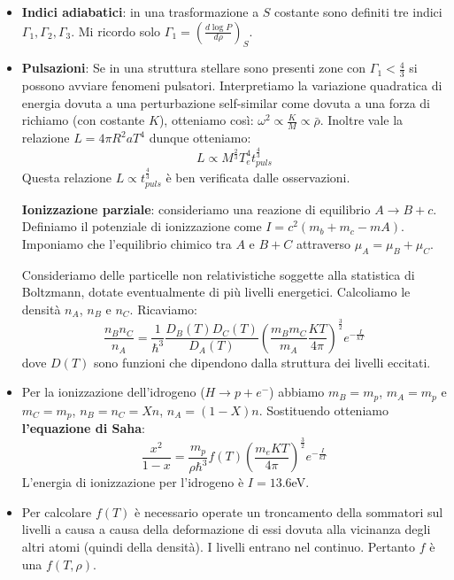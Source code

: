 \documentclass[11pt,a4paper]{article}
\begin{document}
\begin{itemize}
\item \textbf{Indici adiabatici}: in una trasformazione a $S$ costante sono definiti tre indici $\Gamma_1, \Gamma_2, \Gamma_3$. Mi ricordo solo $ \Gamma_1 = \left( \frac{d \log P}{d \rho}\right)_{S}$.

\item \textbf{Pulsazioni}: Se in una struttura stellare sono presenti zone con $\Gamma_1 < \frac{4}{3}$ si possono avviare fenomeni pulsatori. Interpretiamo la variazione quadratica di energia dovuta a una perturbazione self-similar come dovuta a una forza di richiamo (con costante $K$), otteniamo così: $\omega^2 \propto \frac{K}{M} \propto \bar{\rho}$. Inoltre vale la relazione $L = 4 \pi R^2 a T^4$ dunque otteniamo:
\begin{equation}
L \propto M^{\frac{2}{3}} T_{e}^4 t_{puls}^{\frac{4}{3}} 
\end{equation}  
Questa relazione $L \propto  t_{puls}^{\frac{4}{3}}$ è ben verificata dalle osservazioni.

\textbf{\textbf{Ionizzazione parziale}}: consideriamo una reazione di equilibrio $A \rightarrow B+c$. Definiamo il potenziale di ionizzazione come $I = c^2 \left(m_b + m_c - mA \right)$. Imponiamo che l'equilibrio chimico tra $A$ e $B+C$ attraverso $\mu_A = \mu_B + \mu_C$.

\text Consideriamo delle particelle non relativistiche soggette alla statistica di Boltzmann, dotate eventualmente di più livelli energetici. Calcoliamo le densità $n_A$, $n_B$ e $n_C$. Ricaviamo:
\begin{equation}
\frac{n_B n_C}{n_A} = \frac{1}{\hbar^3} \frac{D_B(T) D_C(T)}{D_A(T)} \left( \frac{m_B m_C}{m_A} \frac{KT}{4 \pi}\right)^{\frac{3}{2}}e^{-\frac{I}{kT}}
\end{equation}
dove $D(T)$ sono funzioni che dipendono dalla struttura dei livelli eccitati.

\item Per la ionizzazione dell'idrogeno ($H \rightarrow p + e^{-}$) abbiamo $m_B = m_p$, $m_A = m_p$ e $m_C = m_p$, $n_B = n_C = Xn$, $n_A = (1-X)n$. Sostituendo otteniamo \textbf{l'equazione di  Saha}:
\begin{equation}
\frac{x^2}{1-x} = \frac{m_p}{\rho \hbar^3} f(T) \left( \frac{m_e K T}{4 \pi} \right)^{\frac{3}{2}} e^{-\frac{I}{kT}}
\end{equation}
L'energia di ionizzazione per l'idrogeno è $I = 13.6$eV.

\item Per calcolare $f(T)$ è necessario operate un troncamento della sommatori sul livelli a causa a causa della deformazione di essi dovuta alla vicinanza degli altri atomi (quindi della densità). I livelli entrano nel continuo. Pertanto $f$ è una $f(T, \rho)$.


\end{itemize}
\end{document}
